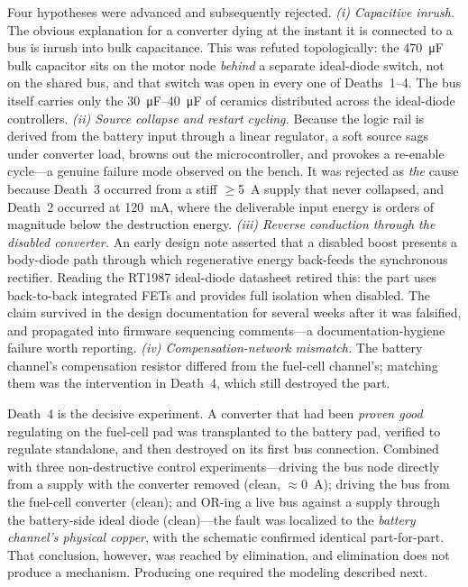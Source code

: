 Four hypotheses were advanced and subsequently rejected. \emph{(i) Capacitive
inrush.} The obvious explanation for a converter dying at the instant it is
connected to a bus is inrush into bulk capacitance. This was refuted
topologically: the \SI{470}{\micro\farad} bulk capacitor sits on the motor node
\emph{behind} a separate ideal-diode switch, not on the shared bus, and that
switch was open in every one of Deaths~1--4. The bus itself carries only the
\SIrange{30}{40}{\micro\farad} of ceramics distributed across the ideal-diode
controllers. \emph{(ii) Source collapse and restart cycling.} Because the logic
rail is derived from the battery input through a linear regulator, a soft source
sags under converter load, browns out the microcontroller, and provokes a
re-enable cycle---a genuine failure mode observed on the bench. It was rejected as
\emph{the} cause because Death~3 occurred from a stiff $\geq$\SI{5}{\ampere}
supply that never collapsed, and Death~2 occurred at \SI{120}{\milli\ampere},
where the deliverable input energy is orders of magnitude below the destruction
energy. \emph{(iii) Reverse conduction through the disabled converter.} An early
design note asserted that a disabled boost presents a body-diode path through
which regenerative energy back-feeds the synchronous rectifier. Reading the
RT1987 ideal-diode datasheet retired this: the part uses back-to-back integrated
FETs and provides full isolation when disabled. The claim survived in the design
documentation for several weeks after it was falsified, and propagated into
firmware sequencing comments---a documentation-hygiene failure worth reporting.
\emph{(iv) Compensation-network mismatch.} The battery channel's compensation
resistor differed from the fuel-cell channel's; matching them was the intervention
in Death~4, which still destroyed the part.

Death~4 is the decisive experiment. A converter that had been \emph{proven good}
regulating on the fuel-cell pad was transplanted to the battery pad, verified to
regulate standalone, and then destroyed on its first bus connection. Combined with
three non-destructive control experiments---driving the bus node directly from a
supply with the converter removed (clean, $\approx$\SI{0}{\ampere}); driving the
bus from the fuel-cell converter (clean); and OR-ing a live bus against a supply
through the battery-side ideal diode (clean)---the fault was localized to the
\emph{battery channel's physical copper}, with the schematic confirmed identical
part-for-part. That conclusion, however, was reached by elimination, and
elimination does not produce a mechanism. Producing one required the modeling
described next.


